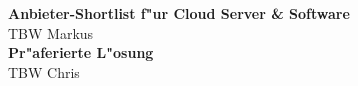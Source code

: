 \textbf{Anbieter-Shortlist f"ur Cloud Server \& Software}\\
TBW Markus\\

\textbf{Pr"aferierte L"osung}\\
TBW Chris\\